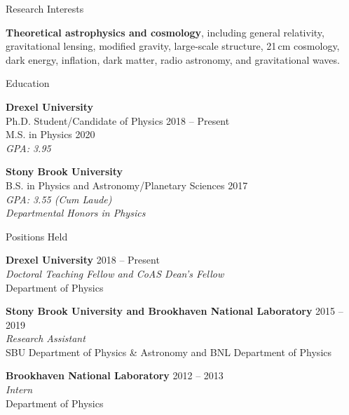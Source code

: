 \documentclass{resume} %
\begin{document}


\begin{rSection}{Research Interests}

\textbf{Theoretical astrophysics and cosmology}, including general relativity, gravitational lensing, modified gravity, large-scale structure, 21\,cm cosmology, dark energy, inflation, dark matter, radio astronomy, and gravitational waves. 

\end{rSection}


\begin{rSection}{Education}

\textbf{Drexel University} \\%
{\color{MidnightBlue} Ph.D.} Student/Candidate of Physics \hfill {2018 -- Present} \\
{\color{MidnightBlue} M.S.} in Physics \hfill{2020}\\
\textit{GPA: 3.95}

\textbf{Stony Brook University} \\%
{\color{MidnightBlue} B.S.} in Physics and Astronomy/Planetary Sciences \hfill{2017}\\
\textit{GPA: 3.55 (Cum Laude)}\\
\textit{Departmental Honors in Physics}

\end{rSection}


\begin{rSection}{Positions Held}

\textbf{Drexel University} \hfill {2018 -- Present} \\
\textit{Doctoral Teaching Fellow and CoAS Dean's Fellow}\\
Department of Physics

\textbf{Stony Brook University and Brookhaven National Laboratory} \hfill {2015 -- 2019}\\
\textit{Research Assistant}\\
SBU Department of Physics \& Astronomy  and BNL Department of Physics

\textbf{Brookhaven National Laboratory} \hfill {2012 -- 2013}\\
\textit{Intern}\\
Department of Physics

\end{rSection}
\end{document}
